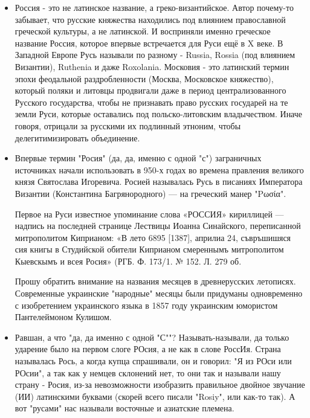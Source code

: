 \begin{itemize}
\begin{multicols}{2}
А нам другое здесь важней
Страна должна быть для людей!
Чтоб процветали тут всегда -
Деревни, сёла, города!

Чтоб мы ценили вновь и вновь
Заботу, верность и любовь!
Чтобы шумели тополя,
И крепла русская земля!
	\restorecr
\end{multicols}

\item {}

Россия - это не латинское название, а греко-византийское. Автор почему-то
забывает, что русские княжества находились под влиянием православной греческой
культуры, а не латинской. И восприняли именно греческое название Россия,
которое впервые встречается для Руси ещё в X веке. В Западной Европе Русь
называли по разному - Russia, Rossia (под влиянием Византии), Ruthenia и даже
Roxolania. Московия - это латинский термин эпохи феодальной раздробленности
(Москва, Московское княжество), который поляки и литовцы продвигали даже в
период централизованного Русского государства, чтобы не признавать право
русских государей на те земли Руси, которые оставались под польско-литовским
владычеством. Иначе говоря, отрицали за русскими их подлинный этноним, чтобы
делегитимизировать объединение.

\item {}

Впервые термин "Росия" (да, да, именно с одной "с") заграничных источниках
начали использовать в 950-х годах во времена правления великого князя
Святослава Игоревича. Росией называлась Русь в писаниях Императора Византии
(Константина Багрянородного) — на греческий манер "Ρωσία".

Первое на Руси известное упоминание слова «РОССИЯ» кириллицей — надпись на
последней странице Лествицы Иоанна Синайского, переписанной митрополитом
Киприаном: «В лето 6895 [1387], априлиа 24, съвръшишяся сия книгы в Студийской
обители Киприаном смереннымъ митрополитом Кыевскымъ и всея Росия» (РГБ. Ф.
173/1. № 152. Л. 279 об.

Прошу обратить внимание на названия месяцев в древнерусских летописях.
Современные украинские "народные" месяцы были придуманы одновременно с
изобретением украинского языка в 1857 году украинским юмористом Пантелеймоном
Кулишом.

\item {}

Равшан, а что "да, да именно с одной "С""? Называть-называли, да только
ударение было на первом слоге РОсия, а не как в слове РоссИя. Страна называлась
Рось, а когда купца спрашивали, он и говорил: "Я из РОси или РОсии", а так как
у немцев склонений нет, то они так и называли нашу страну - Росия, из-за
невозможности изобразить правильное двойное звучание (ИИ) латинскими буквами
(скорей всего писали "Rosiy", или как-то так). А вот "русами" нас называли
восточные и азиатские племена.


\end{itemize}
